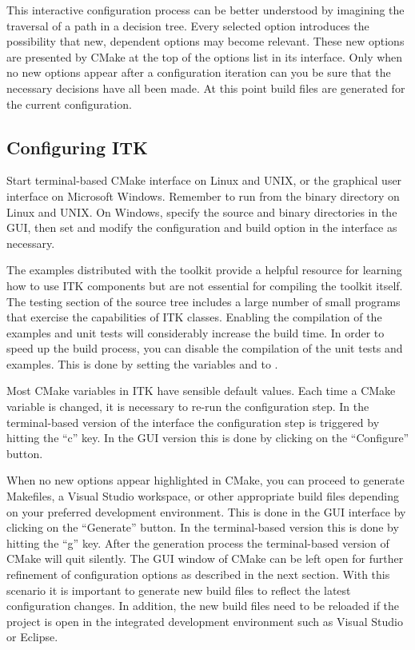 This interactive configuration process can be better understood by imagining
the traversal of a path in a decision tree. Every selected option introduces the
possibility that new, dependent options may become relevant. These new options
are presented by CMake at the top of the options list in its interface. Only
when no new options appear after a configuration iteration can you be sure that
the necessary decisions have all been made. At this point build files are
generated for the current configuration.

\subsection{Configuring ITK}
\label{sec:ConfigureITK}


Start terminal-based CMake interface  on Linux and UNIX, or the
graphical user interface  on Microsoft Windows. Remember to run
 from the binary directory on Linux and UNIX. On Windows, specify
the source and binary directories in the GUI, then set and modify the
configuration and build option in the interface as necessary.

The examples distributed with the toolkit provide a helpful resource for
learning how to use ITK components but are not essential for compiling the
toolkit itself. The testing section of the source tree includes a large number
of small programs that exercise the capabilities of ITK classes. Enabling the
compilation of the examples and unit tests will considerably increase the build
time. In order to speed up the build process, you can disable the compilation of
the unit tests and examples. This is done by setting the variables
 and  to .

Most CMake variables in ITK have sensible default values. Each time a CMake
variable is changed, it is necessary to re-run the configuration step. In the
terminal-based version of the interface the configuration step is triggered by
hitting the ``c'' key. In the GUI version this is done by clicking on the
``Configure'' button.

When no new options appear highlighted in CMake, you can proceed to generate
Makefiles, a Visual Studio workspace, or other appropriate build files depending
on your preferred development environment. This is done in the GUI interface by
clicking on the ``Generate'' button. In the terminal-based version this is done
by hitting the ``g'' key. After the generation process the terminal-based
version of CMake will quit silently. The GUI window of CMake can be left open
for further refinement of configuration options as described in the next
section. With this scenario it is important to generate new build files to
reflect the latest configuration changes. In addition, the new build files need
to be reloaded if the project is open in the integrated development environment
such as Visual Studio or Eclipse.

